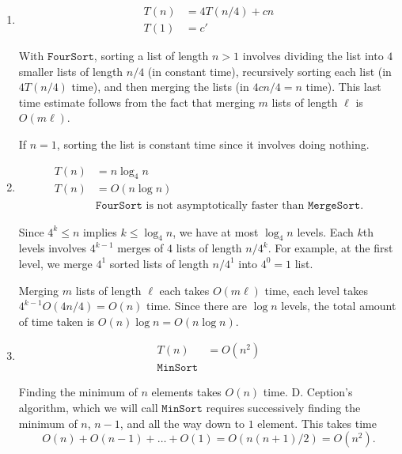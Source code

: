 \documentclass[12 pt, letterpaper]{hmcpset}
\begin{document}
\begin{solution}
	\begin{enumerate}
		\item
			\[
				\boxed{
					\begin{aligned}
						T(n) & = 4 T(n / 4) + cn \\
						T(1) & = c'
					\end{aligned}
				}
			\]

			With $\mathtt{FourSort}$, sorting a list of length $n > 1$ involves dividing the list into $4$ smaller lists of length $n / 4$ (in constant time), recursively sorting each list (in $4 T(n / 4)$ time), and then merging the lists (in $4cn / 4 = n$ time). This last time estimate follows from the fact that merging $m$ lists of length $\ell$ is $O(m \ell)$.

			If $n = 1$, sorting the list is constant time since it involves doing nothing.

		\item
			\[
				\boxed{
					\begin{aligned}
						T(n) & = n \log_{4} n \\
						T(n) & = O(n \log n) \\
						     & \text{$\mathtt{FourSort}$ is not asymptotically faster than $\mathtt{MergeSort}$.}
					\end{aligned}
				}
			\]

			Since $4^{k} \le n$ implies $k \le \log_{4} n$, we have at most $\log_{4} n$ levels. Each $k$th levels involves $4^{k - 1}$ merges of $4$ lists of length $n / 4^{k}$. For example, at the first level, we merge $4^{1}$ sorted lists of length $n / 4^{1}$ into $4^{0} = 1$ list. 

			Merging $m$ lists of length $\ell$ each takes $O(m \ell)$ time, each level takes $4^{k - 1} O(4 n / 4) = O(n)$ time. Since there are $\log n$ levels, the total amount of time taken is $O(n) \log n = O(n \log n)$.

		\item
			\[
				\boxed{
					\begin{aligned}
						T(n) & = O(n^{2}) \\
						\mathtt{MinSort}
					\end{aligned}
				}
			\]

			Finding the minimum of $n$ elements takes $O(n)$ time. D. Ception's algorithm, which we will call $\mathtt{MinSort}$ requires successively finding the minimum of $n$, $n - 1$, and all the way down to $1$ element. This takes time
			 \[
				O(n) + O(n - 1) + \dots + O(1) = O(n (n + 1) / 2) = O(n^{2}).
			\]
\end{enumerate}
\end{solution}
\end{document}
